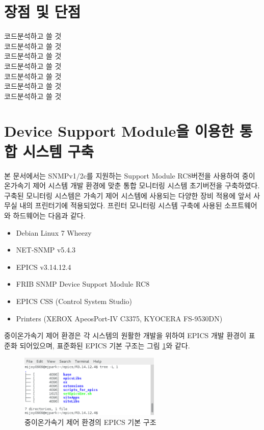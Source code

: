 \documentclass[11pt
  , a4paper
  , article
  , oneside
]{memoir}
\begin{document}
\section{장점 및 단점}
코드분석하고 쓸 것\\
코드분석하고 쓸 것\\
코드분석하고 쓸 것\\
코드분석하고 쓸 것\\
코드분석하고 쓸 것\\
코드분석하고 쓸 것\\
코드분석하고 쓸 것\\

\clearpage

\section{Device Support Module을 이용한 통합 시스템 구축}
본 문서에서는 SNMPv1/2c를 지원하는 Support Module RC8버전을 사용하여 중이온가속기 제어 시스템 개발 환경에 맞춘 통합 모니터링 시스템 초기버전을 구축하였다. 구축된 모니터링 시스템은 가속기 제어 시스템에 사용되는 다양한 장비 적용에 앞서 사무실 내의 프린터기에 적용되었다.
프린터 모니터링 시스템 구축에 사용된 소프트웨어와 하드웨어는 다음과 같다.

\begin{itemize}
\item Debian Linux 7 Wheezy
\item NET-SNMP v5.4.3
\item EPICS v3.14.12.4
\item FRIB SNMP Device Support Module RC8
\item EPICS CSS (Control System Studio)
\item Printers (XEROX ApeosPort-IV C3375, KYOCERA FS-9530DN)
\end{itemize}

중이온가속기 제어 환경은 각 시스템의 원활한 개발을 위하여 EPICS 개발 환경이 표준화 되어있으며\citep{epicsev}, 표준화된 EPICS 기본 구조는 그림 \ref{fig:epicstree}와 같다.

\begin{figure}[h!]
  \centering
  \includegraphics[width=0.6\textwidth]{./images/epicstree.eps}
  \caption{중이온가속기 제어 환경의 EPICS 기본 구조}
  \label{fig:epicstree}   
\end{figure}
\end{document}
